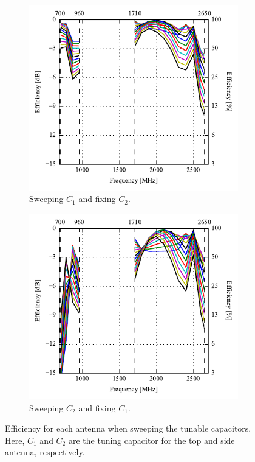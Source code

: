 \begin{figure}[htbp]
    \centering
    \begin{subfigure}{0.49\linewidth}
        \includegraphics{img/tech_sol/monopole/free_space/efficiency-ac1-csh1}
        \caption{Sweeping $C_1$ and fixing $C_2$.}
    \end{subfigure}
    \hfill
    \begin{subfigure}{0.49\linewidth}
        \includegraphics{img/tech_sol/monopole/free_space/efficiency-ac2-csh2}
        \caption{Sweeping $C_2$ and fixing $C_1$.}
    \end{subfigure}
    \caption{Efficiency for each antenna when sweeping the tunable capacitors. Here, $C_1$ and $C_2$ are the tuning capacitor for the top and side antenna, respectively.}
    \label{fig:eff_sol1_free}
\end{figure}




